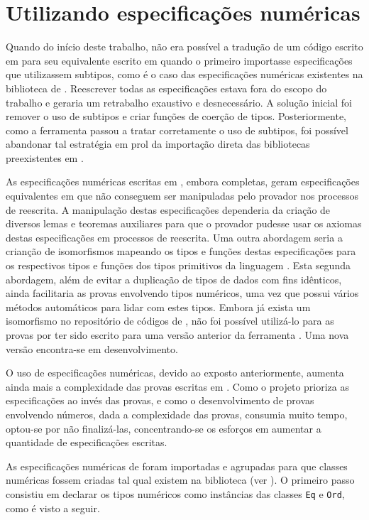 \section{Utilizando especificações numéricas}
Quando do início deste trabalho, não era possível a tradução de um código escrito em \HasCASL para seu equivalente escrito em \HOL quando o primeiro importasse especificações que utilizassem subtipos, como é o caso das especificações numéricas existentes na biblioteca de \CASL.
Reescrever todas as especificações estava fora do escopo do trabalho e geraria um retrabalho exaustivo e desnecessário.
A solução inicial foi remover o uso de subtipos e criar funções de coerção de tipos.
Posteriormente, como a ferramenta \Hets passou a tratar corretamente o uso de subtipos, foi possível abandonar tal estratégia em prol da importação direta das bibliotecas preexistentes em \CASL.

As especificações numéricas escritas em \CASL, embora completas, geram especificações equivalentes em \HOL que não conseguem ser manipuladas pelo provador \Isabelle nos processos de reescrita.
A manipulação destas especificações dependeria da criação de diversos lemas e teoremas auxiliares para que o provador \Isabelle pudesse usar os axiomas destas especificações em processos de reescrita.
Uma outra abordagem seria a crianção de isomorfismos mapeando os tipos e funções destas especificações para os respectivos tipos e funções dos tipos primitivos da linguagem \HOL.
Esta segunda abordagem, além de evitar a duplicação de tipos de dados com fins idênticos, ainda facilitaria as provas envolvendo tipos numéricos, uma vez que \Isabelle possui vários métodos automáticos para lidar com estes tipos.
Embora já exista um isomorfismo no repositório de códigos de \CASL, não foi possível utilizá-lo para as provas por ter sido escrito para uma versão anterior da ferramenta \HOL.
Uma nova versão encontra-se em desenvolvimento.

O uso de especificações numéricas, devido ao exposto anteriormente, aumenta ainda mais a complexidade das provas escritas em \HOL.
Como o projeto prioriza as especificações ao invés das provas, e como o desenvolvimento de provas envolvendo números, dada a complexidade das provas, consumia muito tempo, optou-se por não finalizá-las, concentrando-se os esforços em aumentar a quantidade de especificações escritas.

As especificações numéricas de \CASL foram importadas e agrupadas para que classes numéricas fossem criadas tal qual existem na biblioteca \Prelude (ver ).
O primeiro passo consistiu em declarar os tipos numéricos como instâncias das classes \Verb.Eq. e \Verb.Ord., como é visto a seguir.


